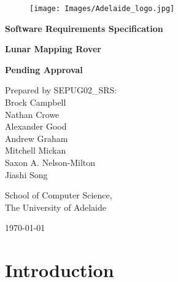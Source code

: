\documentclass{article}
\begin{document}
\begin{titlepage}
	\centering
    \begin{figure}[h!]
    	\centering
    	\texttt{[image: Images/Adelaide\_logo.jpg]}
    \end{figure}
    
    {\bfseries \huge Software Requirements Specification \par}
    \vspace{.5cm} 
    {\bfseries\huge Lunar Mapping Rover \par}
	\vspace{2cm}
	{\bfseries\large Pending Approval \par}
    \vspace{2cm}
	{{\Large Prepared by SEPUG02\_SRS:} 
    \vspace{.25cm} 
    \\ {\large Brock Campbell 
    \\ Nathan Crowe 
    \\ Alexander Good
    \\ Andrew Graham
    \\ Mitchell Mickan 
    \\ Saxon A. Nelson-Milton
    \\ Jiashi Song} \par}
    \vspace{1cm}
	{\large School of Computer Science, \\ The University of Adelaide \par}
    \vspace{1cm}
	{\large \today \par}
\end{titlepage}

\tableofcontents
\newpage

\section{Introduction}
\end{document}
